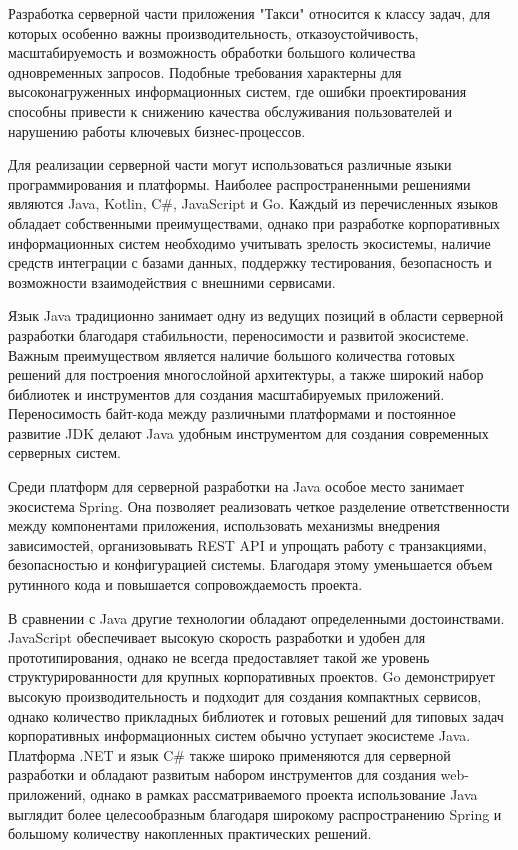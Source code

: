 \subtitlespace

{\gostFont
	
	\par \redline Разработка серверной части приложения "Такси"{} относится к классу задач, для которых особенно важны производительность, отказоустойчивость, масштабируемость и возможность обработки большого количества одновременных запросов. Подобные требования характерны для высоконагруженных информационных систем, где ошибки проектирования способны привести к снижению качества обслуживания пользователей и нарушению работы ключевых бизнес-процессов.
	
	\par \redline Для реализации серверной части могут использоваться различные языки программирования и платформы. Наиболее распространенными решениями являются Java, Kotlin, C\#, JavaScript и Go. Каждый из перечисленных языков обладает собственными преимуществами, однако при разработке корпоративных информационных систем необходимо учитывать зрелость экосистемы, наличие средств интеграции с базами данных, поддержку тестирования, безопасность и возможности взаимодействия с внешними сервисами.
	
	\par \redline Язык Java традиционно занимает одну из ведущих позиций в области серверной разработки благодаря стабильности, переносимости и развитой экосистеме. Важным преимуществом является наличие большого количества готовых решений для построения многослойной архитектуры, а также широкий набор библиотек и инструментов для создания масштабируемых приложений. Переносимость байт-кода между различными платформами и постоянное развитие JDK делают Java удобным инструментом для создания современных серверных систем.
	
	\par \redline Среди платформ для серверной разработки на Java особое место занимает экосистема Spring. Она позволяет реализовать четкое разделение ответственности между компонентами приложения, использовать механизмы внедрения зависимостей, организовывать REST API и упрощать работу с транзакциями, безопасностью и конфигурацией системы. Благодаря этому уменьшается объем рутинного кода и повышается сопровождаемость проекта.
	
	\par \redline В сравнении с Java другие технологии обладают определенными достоинствами. JavaScript обеспечивает высокую скорость разработки и удобен для прототипирования, однако не всегда предоставляет такой же уровень структурированности для крупных корпоративных проектов. Go демонстрирует высокую производительность и подходит для создания компактных сервисов, однако количество прикладных библиотек и готовых решений для типовых задач корпоративных информационных систем обычно уступает экосистеме Java. Платформа .NET и язык C\# также широко применяются для серверной разработки и обладают развитым набором инструментов для создания web-приложений, однако в рамках рассматриваемого проекта использование Java выглядит более целесообразным благодаря широкому распространению Spring и большому количеству накопленных практических решений.
	
}
